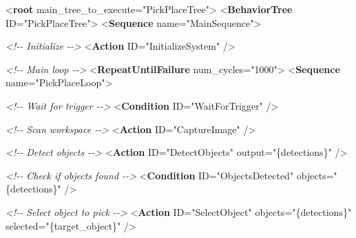 \documentclass[
]{article}
\newenvironment{Shaded}{\begin{snugshade}}{\end{snugshade}}
\newcommand{\CommentTok}[1]{\textcolor[rgb]{0.56,0.35,0.01}{\textit{#1}}}
\newcommand{\KeywordTok}[1]{\textcolor[rgb]{0.13,0.29,0.53}{\textbf{#1}}}
\newcommand{\NormalTok}[1]{#1}
\newcommand{\OtherTok}[1]{\textcolor[rgb]{0.56,0.35,0.01}{#1}}
\newcommand{\StringTok}[1]{\textcolor[rgb]{0.31,0.60,0.02}{#1}}
\begin{document}
\begin{Shaded}
\begin{Highlighting}[]
\NormalTok{\textless{}}\KeywordTok{root}\OtherTok{ main\_tree\_to\_execute=}\StringTok{"PickPlaceTree"}\NormalTok{\textgreater{}}
\NormalTok{    \textless{}}\KeywordTok{BehaviorTree}\OtherTok{ ID=}\StringTok{"PickPlaceTree"}\NormalTok{\textgreater{}}
\NormalTok{        \textless{}}\KeywordTok{Sequence}\OtherTok{ name=}\StringTok{"MainSequence"}\NormalTok{\textgreater{}}

            \CommentTok{\textless{}!{-}{-} Initialize {-}{-}\textgreater{}}
\NormalTok{            \textless{}}\KeywordTok{Action}\OtherTok{ ID=}\StringTok{"InitializeSystem"}\NormalTok{ /\textgreater{}}

            \CommentTok{\textless{}!{-}{-} Main loop {-}{-}\textgreater{}}
\NormalTok{            \textless{}}\KeywordTok{RepeatUntilFailure}\OtherTok{ num\_cycles=}\StringTok{"1000"}\NormalTok{\textgreater{}}
\NormalTok{                \textless{}}\KeywordTok{Sequence}\OtherTok{ name=}\StringTok{"PickPlaceLoop"}\NormalTok{\textgreater{}}

                    \CommentTok{\textless{}!{-}{-} Wait for trigger {-}{-}\textgreater{}}
\NormalTok{                    \textless{}}\KeywordTok{Condition}\OtherTok{ ID=}\StringTok{"WaitForTrigger"}\NormalTok{ /\textgreater{}}

                    \CommentTok{\textless{}!{-}{-} Scan workspace {-}{-}\textgreater{}}
\NormalTok{                    \textless{}}\KeywordTok{Action}\OtherTok{ ID=}\StringTok{"CaptureImage"}\NormalTok{ /\textgreater{}}

                    \CommentTok{\textless{}!{-}{-} Detect objects {-}{-}\textgreater{}}
\NormalTok{                    \textless{}}\KeywordTok{Action}\OtherTok{ ID=}\StringTok{"DetectObjects"}\OtherTok{ output=}\StringTok{"\{detections\}"}\NormalTok{ /\textgreater{}}

                    \CommentTok{\textless{}!{-}{-} Check if objects found {-}{-}\textgreater{}}
\NormalTok{                    \textless{}}\KeywordTok{Condition}\OtherTok{ ID=}\StringTok{"ObjectsDetected"}\OtherTok{ objects=}\StringTok{"\{detections\}"}\NormalTok{ /\textgreater{}}

                    \CommentTok{\textless{}!{-}{-} Select object to pick {-}{-}\textgreater{}}
\NormalTok{                    \textless{}}\KeywordTok{Action}\OtherTok{ ID=}\StringTok{"SelectObject"}
\OtherTok{                            objects=}\StringTok{"\{detections\}"}
\OtherTok{                            selected=}\StringTok{"\{target\_object\}"}\NormalTok{ /\textgreater{}}


\end{Highlighting}
\end{Shaded}
\end{document}
